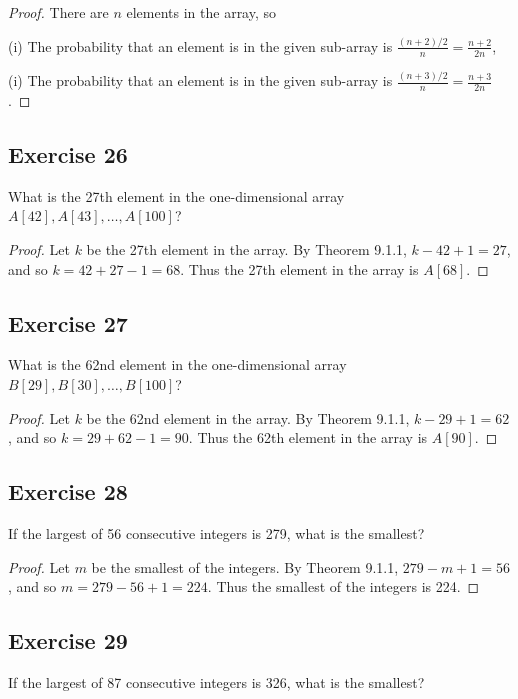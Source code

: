 \documentclass[14pt]{extarticle}
\begin{document}
\begin{proof}
There are $n$ elements in the array, so

(i) The probability that an element is in the given sub-array is \(\frac{(n+2)/2}{n} = \frac{n+2}{2n}\),

(i) The probability that an element is in the given sub-array is \(\frac{(n+3)/2}{n} = \frac{n+3}{2n}\).
\end{proof}

\subsection{Exercise 26}
What is the 27th element in the one-dimensional array \(A[42], A[43], \ldots, A[100]\)?

\begin{proof}
Let $k$ be the 27th element in the array. By Theorem 9.1.1, \(k - 42 + 1 = 27\), and so \(k = 42 + 27 - 1 = 68\). 
Thus the 27th element in the array is \(A[68]\).
\end{proof}

\subsection{Exercise 27}
What is the 62nd element in the one-dimensional array \(B[29], B[30], \ldots, B[100]\)?

\begin{proof}
Let $k$ be the 62nd element in the array. By Theorem 9.1.1, \(k - 29 + 1 = 62\), and so \(k = 29 + 62 - 1 = 90\). 
Thus the 62th element in the array is \(A[90]\).
\end{proof}

\subsection{Exercise 28}
If the largest of 56 consecutive integers is 279, what is the smallest?

\begin{proof}
Let $m$ be the smallest of the integers. By Theorem 9.1.1, \(279 - m + 1 = 56\), and so \(m = 279 - 56 + 1 = 224\). 
Thus the smallest of the integers is 224.
\end{proof}

\subsection{Exercise 29}
If the largest of 87 consecutive integers is 326, what is the smallest?
\end{document}
